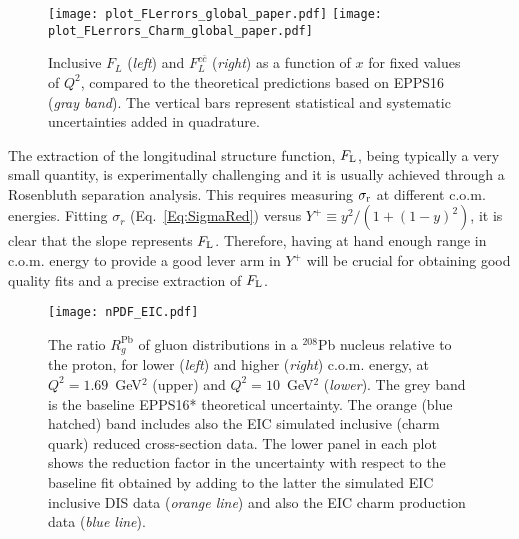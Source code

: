 \documentclass{PoS}
\begin{document}
\begin{figure}[t] 
   \centering
   \texttt{[image: plot\_FLerrors\_global\_paper.pdf]}   
   \texttt{[image: plot\_FLerrors\_Charm\_global\_paper.pdf]}   
   \caption{Inclusive $F_L$ ({\em left}) and $F_L^{c\bar{c}}$ ({\em right}) as a function of $x$ for fixed values of $Q^{2}$, compared to the theoretical predictions based on EPPS16 ({\it gray band}). The vertical bars represent statistical and systematic uncertainties added in quadrature.}
   \label{Fig:FL}
\end{figure}


The extraction of the longitudinal structure function, $F_{\rm L}$, being typically a very small quantity, is experimentally challenging and it is usually achieved through a Rosenbluth separation analysis. This requires measuring $\sigma_{\rm r}$ at different c.o.m. energies. Fitting $\sigma_{r}$ (Eq.~\ref{Eq:SigmaRed}) versus $Y^{+} \equiv y^2/(1+(1-y)^2)$, it is clear that the slope represents $F_{\rm L}$.   
Therefore, having at hand enough range in c.o.m. energy to provide a good lever arm in $Y^{+}$ will be crucial for obtaining good quality fits and a precise extraction of $F_{\rm L}$. 

\begin{figure}[t]
  \centering
  \texttt{[image: nPDF\_EIC.pdf]} 
  \caption{The ratio $R_g^{\textrm{Pb}}$ of gluon distributions in a $^{208}$Pb nucleus relative to the proton, for lower ({\it left}) and higher ({\it right}) c.o.m. energy, at $Q^{2}=1.69$~GeV$^{2}$ ({upper}) and $Q^{2}=10$~GeV$^{2}$ ({\it lower}). The grey band is the baseline EPPS16* theoretical uncertainty. The orange (blue hatched) band includes also the EIC simulated inclusive (charm quark) reduced cross-section data. The lower panel in each plot shows the reduction factor in the uncertainty with respect to the baseline fit obtained by adding to the latter the simulated EIC inclusive DIS data ({\it orange line}) and also the EIC charm production data ({\it blue line}).}
  \label{Fig:epps16ratios}			
\end{figure}
\end{document}
